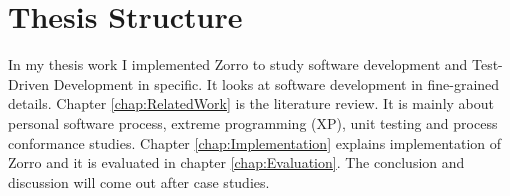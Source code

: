\section{Thesis Structure}
In my thesis work I implemented Zorro to study software development and
Test-Driven Development in specific. It looks at software development in
fine-grained details. Chapter \ref{chap:RelatedWork} is the literature
review. It is mainly about personal software process, extreme programming
(XP), unit testing and process conformance studies. Chapter
\ref{chap:Implementation} explains implementation of Zorro and it is
evaluated in chapter \ref{chap:Evaluation}.  The conclusion and discussion
will come out after case studies.


